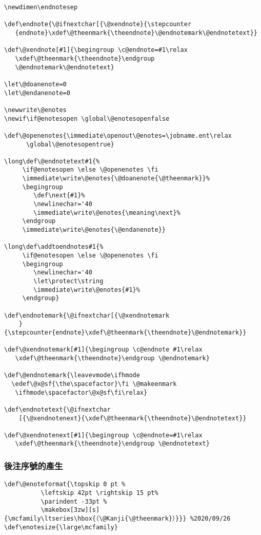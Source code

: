 \begin{lstlisting}[firstnumber=1531]
\newdimen\endnotesep

\def\endnote{\@ifnextchar[{\@xendnote}{\stepcounter
   {endnote}\xdef\@theenmark{\theendnote}\@endnotemark\@endnotetext}}

\def\@xendnote[#1]{\begingroup \c@endnote=#1\relax
   \xdef\@theenmark{\theendnote}\endgroup
   \@endnotemark\@endnotetext}

\let\@doanenote=0
\let\@endanenote=0

\newwrite\@enotes
\newif\if@enotesopen \global\@enotesopenfalse

\def\@openenotes{\immediate\openout\@enotes=\jobname.ent\relax
      \global\@enotesopentrue}

\long\def\@endnotetext#1{%
     \if@enotesopen \else \@openenotes \fi
     \immediate\write\@enotes{\@doanenote{\@theenmark}}%
     \begingroup
        \def\next{#1}%
        \newlinechar='40
        \immediate\write\@enotes{\meaning\next}%
     \endgroup
     \immediate\write\@enotes{\@endanenote}}

\long\def\addtoendnotes#1{%
     \if@enotesopen \else \@openenotes \fi
     \begingroup
        \newlinechar='40
        \let\protect\string
        \immediate\write\@enotes{#1}%
     \endgroup}

\def\endnotemark{\@ifnextchar[{\@xendnotemark
    }{\stepcounter{endnote}\xdef\@theenmark{\theendnote}\@endnotemark}}

\def\@xendnotemark[#1]{\begingroup \c@endnote #1\relax
   \xdef\@theenmark{\theendnote}\endgroup \@endnotemark}

\def\@endnotemark{\leavevmode\ifhmode
  \edef\@x@sf{\the\spacefactor}\fi \@makeenmark
   \ifhmode\spacefactor\@x@sf\fi\relax}

\def\endnotetext{\@ifnextchar
    [{\@xendnotenext}{\xdef\@theenmark{\theendnote}\@endnotetext}}

\def\@xendnotenext[#1]{\begingroup \c@endnote=#1\relax
   \xdef\@theenmark{\theendnote}\endgroup \@endnotetext}
\end{lstlisting}

\subsubsection{後注序號的產生}

\begin{lstlisting}[firstnumber=1583]
\def\@enoteformat{\topskip 0 pt %
          \leftskip 42pt \rightskip 15 pt%
          \parindent -33pt %
          \makebox[3zw][s]{\mcfamily\ltseries\hbox{（\@Kanji{\@theenmark}）}}} %2020/09/26
\def\enotesize{\large\mcfamily}
\end{lstlisting}

